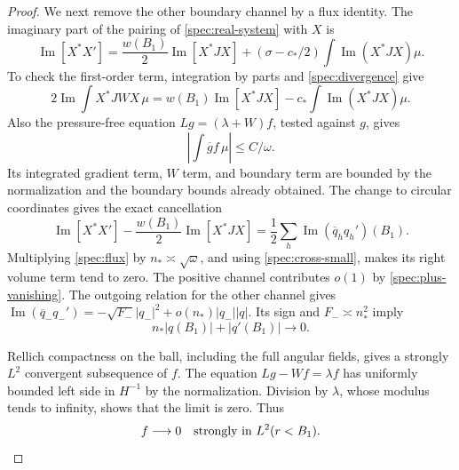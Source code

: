\begin{proof}
We next remove the other boundary channel by a flux identity.
The imaginary part of the pairing of \eqref{spec:real-system} with
$X$ is
\begin{equation}\label{spec:flux}
 \operatorname{Im}[X^*X']
 =\frac{w(B_1)}2\operatorname{Im}[X^*JX]
 +(\sigma-c_*/2)\int\operatorname{Im}(X^*JX)\mu.
\end{equation}
To check the first-order term, integration by parts and
\eqref{spec:divergence} give
\[
2\operatorname{Im}\int X^*JW X\,\mu
=w(B_1)\operatorname{Im}[X^*JX]-c_*\int\operatorname{Im}(X^*JX)\mu.
\]
Also the pressure-free equation $Lg=(\lambda+W)f$, tested against $g$,
gives
\begin{equation}\label{spec:cross-small}
 \left|\int\overline g f\,\mu\right|\le C/\omega.
\end{equation}
Its integrated gradient term, $W$ term, and boundary term are bounded
by the normalization and the boundary bounds already obtained.
The change to circular coordinates gives the exact cancellation
\[
 \operatorname{Im}[X^*X']
 -\frac{w(B_1)}2\operatorname{Im}[X^*JX]
 =\frac12\sum_h\operatorname{Im}(\overline q_hq_h')(B_1).
\]
Multiplying \eqref{spec:flux} by $n_*\asymp\sqrt\omega$, and using
\eqref{spec:cross-small}, makes its right volume term tend to zero.
The positive channel contributes $o(1)$ by
\eqref{spec:plus-vanishing}. The outgoing relation for the other
channel gives
$\operatorname{Im}(\overline q_-q_-')=-\sqrt{F_-}|q_-|^2+
o(n_*)|q_-||q|$. Its sign and $F_-\asymp n_*^2$ imply
\begin{equation}\label{spec:all-boundary-small}
 n_*|q(B_1)|+|q'(B_1)|\longrightarrow0.
\end{equation}

Rellich compactness on the ball, including the full angular fields,
gives a strongly $L^2$ convergent subsequence of $f$. The equation
$Lg-Wf=\lambda f$ has uniformly bounded left side in $H^{-1}$ by
the normalization. Division by $\lambda$, whose modulus tends to
infinity, shows that the limit is zero. Thus
\begin{equation}\label{spec:f-small}
 f\longrightarrow0\quad\hbox{strongly in }L^2(r<B_1).
\end{equation}


\end{proof}
